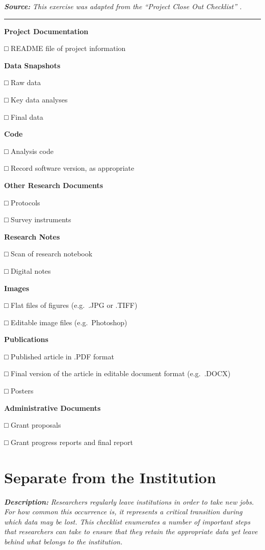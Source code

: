 \documentclass[
]{book}
\begin{document}
\textbf{\emph{Source:}} \emph{This exercise was adapted from the ``Project Close Out Checklist'' \citep{briney_project_2020}.}

\begin{center}\rule{0.5\linewidth}{0.5pt}\end{center}

\textbf{Project Documentation}

□ README file of project information

\textbf{Data Snapshots}

□ Raw data

□ Key data analyses

□ Final data

\textbf{Code}

□ Analysis code

□ Record software version, as appropriate

\textbf{Other Research Documents}

□ Protocols

□ Survey instruments

\textbf{Research Notes}

□ Scan of research notebook

□ Digital notes

\textbf{Images}

□ Flat files of figures (e.g.~.JPG or .TIFF)

□ Editable image files (e.g.~Photoshop)

\textbf{Publications}

□ Published article in .PDF format

□ Final version of the article in editable document format (e.g.~.DOCX)

□ Posters

\textbf{Administrative Documents}

□ Grant proposals

□ Grant progress reports and final report

\hypertarget{separation}{%
\section{Separate from the Institution}\label{separation}}

\textbf{\emph{Description:}} \emph{Researchers regularly leave institutions in order to take new jobs. For how common this occurrence is, it represents a critical transition during which data may be lost. This checklist enumerates a number of important steps that researchers can take to ensure that they retain the appropriate data yet leave behind what belongs to the institution.}
\end{document}
